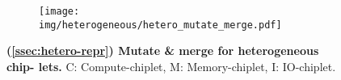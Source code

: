 \begin{figure}[h]
\centering
\captionsetup{justification=centering}
%
\begin{subfigure}{0.99 \columnwidth}
\centering
\texttt{[image: img/heterogeneous/hetero\_mutate\_merge.pdf]}
\end{subfigure}
%
\caption{\textbf{(\textsection \ref{ssec:hetero-repr}) Mutate \& merge for  heterogeneous chip- lets.} C: Compute-chiplet, M: Memory-chiplet, I: IO-chiplet.}
\label{fig:hetero-mutate-merge}
\end{figure}
